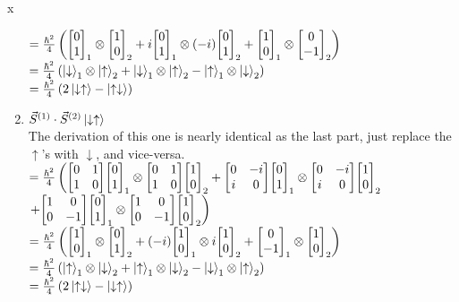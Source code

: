 x\documentclass[12pt]{article}
\begin{document}
\begin{enumerate}[label=\alph*)]
$=\frac{\hbar^2}{4}\left(\mqty[0\\1]_1\otimes\mqty[1\\0]_2 + i\mqty[0\\1]_1\otimes(-i)\mqty[0\\1]_2 + \mqty[1\\0]_1\otimes\mqty[0\\-1]_2\right)$\vspace{0.5em}\\
$=\frac{\hbar^2}{4}\left(\ket{\downarrow}_1\otimes\ket{\uparrow}_2 + \ket{\downarrow}_1\otimes\ket{\uparrow}_2 - \ket{\uparrow}_1\otimes\ket{\downarrow}_2\right)$\vspace{0.5em}\\
$= \frac{\hbar^2}{4}\left(2\ket{\downarrow\uparrow}-\ket{\uparrow\downarrow}\right)$

\item 
\hspace{1em}$\vec{S}^{(1)} \cdot \vec{S}^{(2)} \ket{\downarrow \uparrow}$\vspace{0.5em}\\
The derivation of this one is nearly identical as the last part, just replace the $\uparrow$'s with $\downarrow$, and vice-versa.\vspace{0.5em}\\
$=\frac{\hbar^2}{4}\left(\mqty[0 & 1 \\ 1 & 0]\mqty[0\\1]_1\otimes\mqty[0&1 \\1 & 0]\mqty[1\\0]_2 + \mqty[0 & -i \\ i & 0]\mqty[0\\1]_1\otimes\mqty[0& -i \\ i &0]\mqty[1\\0]_2 \right.$\vspace{0.5em}\\
\hspace*{5em}$\left.+ \mqty[1 &0\\0 &-1]\mqty[0\\1]_1\otimes\mqty[1 & 0 \\ 0 & -1]\mqty[1\\0]_2\right)$\vspace{0.5em}\\
$=\frac{\hbar^2}{4}\left(\mqty[1\\0]_1\otimes\mqty[0\\1]_2 + (-i)\mqty[1\\0]_1\otimes i \mqty[1\\0]_2 + \mqty[0\\-1]_1\otimes\mqty[1\\0]_2\right)$\vspace{0.5em}\\
$=\frac{\hbar^2}{4}\left(\ket{\uparrow}_1\otimes\ket{\downarrow}_2 + \ket{\uparrow}_1\otimes\ket{\downarrow}_2 - \ket{\downarrow}_1\otimes\ket{\uparrow}_2\right)$\vspace{0.5em}\\
$= \frac{\hbar^2}{4}\left(2\ket{\uparrow\downarrow}-\ket{\downarrow\uparrow}\right)$


\end{enumerate}
\end{document}

